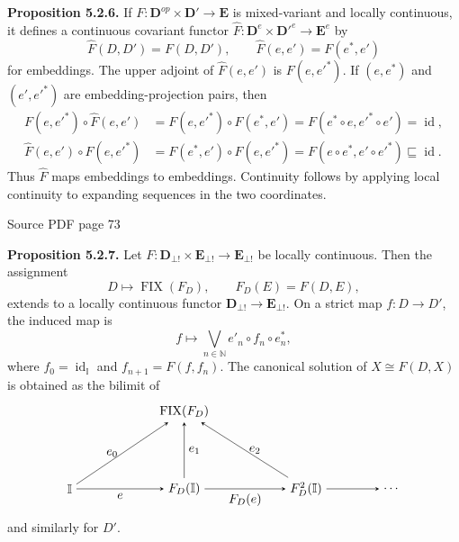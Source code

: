 \documentclass[11pt]{article}
\newcommand{\leanmarker}[2]{%
  \Needspace{3\baselineskip}%
  \marginnote{\hyperlink{#1}{\color{LeanTeal}\fbox{\scriptsize Lean}}}%
  \hypertarget{#1}{\textbf{#2.}}%
}
\newcommand{\sourcepage}[1]{\par\medskip\noindent\textcolor{SourceGray}{\scriptsize Source PDF page #1}\par\smallskip}
\begin{document}
\leanmarker{prop-5-2-6}{Proposition 5.2.6} If \(F:\mathbf{D}^{op}\times\mathbf{D}'\to\mathbf{E}\) is mixed-variant and locally continuous, it defines a continuous covariant functor \(\widehat F:\mathbf{D}^e\times\mathbf{D}'^e\to\mathbf{E}^e\) by
\[
  \widehat F(D,D')=F(D,D'),\qquad
  \widehat F(e,e')=F(e^*,e')
\]
for embeddings. The upper adjoint of \(\widehat F(e,e')\) is \(F(e,e'^*)\). If \((e,e^*)\) and \((e',e'^*)\) are embedding-projection pairs, then
\[
\begin{aligned}
F(e,e'^*)\circ\widehat F(e,e')&=F(e,e'^*)\circ F(e^*,e')=F(e^*\circ e,e'^*\circ e')=\operatorname{id},\\
\widehat F(e,e')\circ F(e,e'^*)&=F(e^*,e')\circ F(e,e'^*)=F(e\circ e^*,e'\circ e'^*)\sqsubseteq\operatorname{id}.
\end{aligned}
\]
Thus \(\widehat F\) maps embeddings to embeddings. Continuity follows by applying local continuity to expanding sequences in the two coordinates.

\sourcepage{73}
\leanmarker{prop-5-2-7}{Proposition 5.2.7} Let \(F:\mathbf{D}_{\bot!}\times\mathbf{E}_{\bot!}\to\mathbf{E}_{\bot!}\) be locally continuous. Then the assignment
\[
  D\mapsto \operatorname{FIX}(F_D),\qquad F_D(E)=F(D,E),
\]
extends to a locally continuous functor \(\mathbf{D}_{\bot!}\to\mathbf{E}_{\bot!}\). On a strict map \(f:D\to D'\), the induced map is
\[
  f\mapsto \bigvee_{n\in\mathbb N} e'_n\circ f_n\circ e_n^*,
\]
where \(f_0=\operatorname{id}_{\mathbb I}\) and \(f_{n+1}=F(f,f_n)\). The canonical solution of \(X\cong F(D,X)\) is obtained as the bilimit of
\[
\begin{tikzpicture}[baseline=(current bounding box.center), >=stealth]
  \node (Fix) at (3.2,2.15) {$\operatorname{FIX}(F_D)$};
  \node (I)   at (0,0) {$\mathbb I$};
  \node (FDI) at (3.2,0) {$F_D(\mathbb I)$};
  \node (FD2) at (6.6,0) {$F_D^2(\mathbb I)$};
  \node (Dots) at (9.0,0) {$\cdots$};
  \draw[->] (I) -- node[below] {$e$} (FDI);
  \draw[->] (FDI) -- node[below] {$F_D(e)$} (FD2);
  \draw[->] (FD2) -- (Dots);
  \draw[->] (I) -- node[left] {$e_0$} (Fix);
  \draw[->] (FDI) -- node[right] {$e_1$} (Fix);
  \draw[->] (FD2) -- node[right] {$e_2$} (Fix);
\end{tikzpicture}
\]
and similarly for \(D'\).

\clearpage
\end{document}
